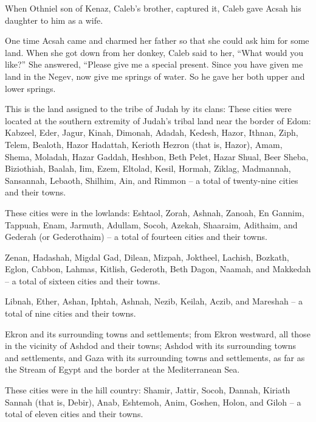 {When Othniel
son
of Kenaz,
Caleb’s brother,
captured
it, Caleb
gave
Acsah
his daughter
to him as a wife.
\par }{\PP {}One time Acsah came
and charmed
her father
so that she could ask him
for some land.
When she got down from her donkey,
Caleb
said
to her, “What would you like?”
She answered,
“Please give
me a special present.
Since
you have given
me land
in the Negev,
now give
me springs
of water.
So he gave
her both upper
and lower
springs.
\par }{\PP {}This
is the land assigned
to the tribe
of Judah
by its clans:
These cities
were located at the southern
extremity of Judah’s
tribal
land near the border
of Edom: Kabzeel,
Eder,
Jagur,
Kinah,
Dimonah,
Adadah,
Kedesh,
Hazor,
Ithnan,
Ziph,
Telem,
Bealoth,
Hazor Hadattah,
Kerioth
Hezron
(that
is, Hazor),
Amam,
Shema,
Moladah,
Hazar Gaddah,
Heshbon,
Beth Pelet,
Hazar Shual,
Beer Sheba,
Biziothiah,
Baalah,
Iim,
Ezem,
Eltolad,
Kesil,
Hormah,
Ziklag,
Madmannah,
Sansannah,
Lebaoth,
Shilhim,
Ain,
and Rimmon
– a total
of twenty-nine
cities
and their towns.
\par }{\PP {}These cities were in the lowlands: Eshtaol,
Zorah,
Ashnah,
Zanoah,
En Gannim,
Tappuah,
Enam,
Jarmuth,
Adullam,
Socoh,
Azekah,
Shaaraim,
Adithaim,
and Gederah
(or Gederothaim) – a total of fourteen cities and their towns.
\par }{\PP {}Zenan,
Hadashah,
Migdal Gad,
Dilean,
Mizpah,
Joktheel,
Lachish,
Bozkath,
Eglon,
Cabbon,
Lahmas,
Kitlish,
Gederoth,
Beth Dagon,
Naamah,
and Makkedah
– a total of sixteen
cities
and their towns.
\par }{\PP {}Libnah,
Ether,
Ashan,
Iphtah,
Ashnah,
Nezib,
Keilah,
Aczib,
and Mareshah
– a total of nine
cities
and their towns.
\par }{\PP {}Ekron
and its surrounding towns
and settlements;
from Ekron
westward,
all
those in the vicinity
of Ashdod
and their towns;
Ashdod
with its surrounding towns
and settlements,
and Gaza
with its surrounding towns
and settlements,
as far
as the Stream
of Egypt
and the border
at the Mediterranean
Sea.
\par }{\PP {}These cities were in the hill country: Shamir,
Jattir,
Socoh,
Dannah,
Kiriath Sannah
(that
is, Debir),
Anab,
Eshtemoh,
Anim,
Goshen,
Holon,
and Giloh
– a total of eleven
cities
and their towns.
}
